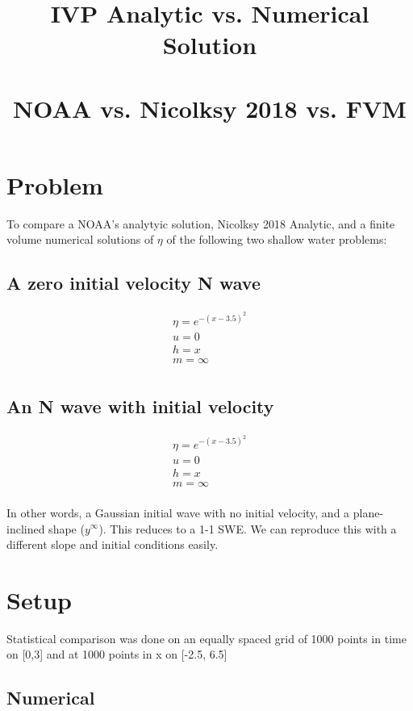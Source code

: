 \documentclass{article}
\title{ IVP Analytic vs. Numerical Solution \\ \\
	\large NOAA vs. Nicolksy 2018 vs. FVM
}
\begin{document}
\maketitle

\section{Problem}

To compare a NOAA's analytyic solution, Nicolksy 2018 Analytic, and a finite volume numerical solutions of $\eta$ of the following two shallow water problems:

\subsection {A zero initial velocity N wave}

\[
\begin{aligned}
\eta = e^{-(x-3.5)^2} \\
u = 0 \\
h = x \\
m = \infty  \\
\end{aligned}
\]

\subsection{An N wave with initial velocity}

\[
\begin{aligned}
\eta = e^{-(x-3.5)^2} \\
u = 0 \\
h = x \\
m = \infty  \\
\end{aligned}
\]

In other words, a Gaussian initial wave with no initial velocity, and a plane-inclined shape ($y^\infty$). This reduces to a 1-1 SWE. We can reproduce this with a different slope and initial conditions easily.

\section{Setup}

Statistical comparison was done on an equally spaced grid of 1000 points in time on [0,3] and at 1000 points in x on [-2.5, 6.5]


\subsection{Numerical}
\end{document}
